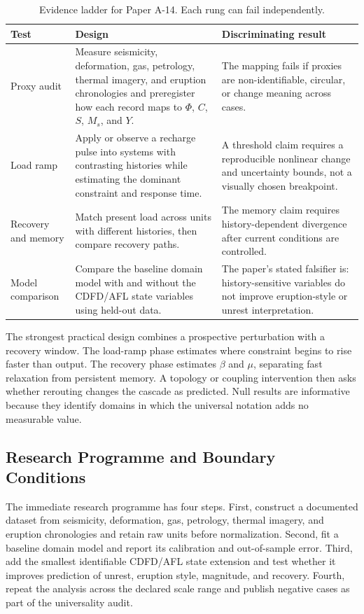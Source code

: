 \documentclass[11pt,a4paper]{article}
\begin{document}
\begin{table}[htbp]
\centering
\small
\caption{Evidence ladder for Paper A-14. Each rung can fail independently.}
\begin{tabularx}{\textwidth}{|p{}|X|X|}
\hline
\textbf{Test} & \textbf{Design} & \textbf{Discriminating result} \\
\hline
Proxy audit & Measure seismicity, deformation, gas, petrology, thermal imagery, and eruption chronologies and preregister how each record maps to $\Phi$, $C$, $S$, $M_s$, and $Y$. & The mapping fails if proxies are non-identifiable, circular, or change meaning across cases. \\
\hline
Load ramp & Apply or observe a recharge pulse into systems with contrasting histories while estimating the dominant constraint and response time. & A threshold claim requires a reproducible nonlinear change and uncertainty bounds, not a visually chosen breakpoint. \\
\hline
Recovery and memory & Match present load across units with different histories, then compare recovery paths. & The memory claim requires history-dependent divergence after current conditions are controlled. \\
\hline
Model comparison & Compare the baseline domain model with and without the CDFD/AFL state variables using held-out data. & The paper's stated falsifier is: history-sensitive variables do not improve eruption-style or unrest interpretation. \\
\hline
\end{tabularx}
\end{table}

The strongest practical design combines a prospective perturbation with a
recovery window. The load-ramp phase estimates where constraint begins to rise
faster than output. The recovery phase estimates $\beta$ and $\mu$, separating
fast relaxation from persistent memory. A topology or coupling intervention
then asks whether rerouting changes the cascade as predicted. Null results are
informative because they identify domains in which the universal notation adds
no measurable value.

\subsection{Research Programme and Boundary Conditions}

The immediate research programme has four steps. First, construct a documented
dataset from seismicity, deformation, gas, petrology, thermal imagery, and eruption chronologies and retain raw units before normalization.
Second, fit a baseline domain model and report its calibration and out-of-sample
error. Third, add the smallest identifiable CDFD/AFL state extension and test
whether it improves prediction of unrest, eruption style, magnitude, and recovery. Fourth, repeat the
analysis across the declared scale range and publish negative cases as part of
the universality audit.
\end{document}
